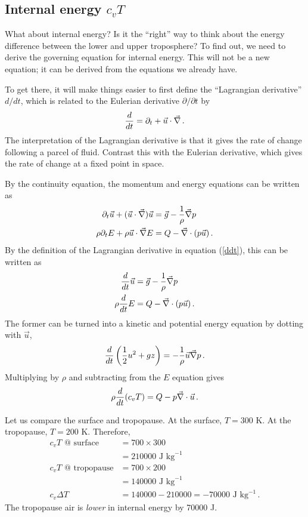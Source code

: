 \documentclass[12pt]{article}
\begin{document}
\subsection{Internal energy $c_v T$}


What about internal energy?  Is it the ``right'' way to think about the energy difference between the lower and upper troposphere?  To find out, we need to derive the governing equation for internal energy.  This will not be a new equation; it can be derived from the equations we already have.


To get there, it will make things easier to first define the ``Lagrangian derivative'' $d/dt$, which is related to the Eulerian derivative $\partial/\partial t$ by
\begin{equation}
{\frac{d}{dt}} = \partial_t + \vec{u} \cdot {\vec{\nabla}} \, . \label{ddt}
\end{equation}
The interpretation of the Lagrangian derivative is that it gives the rate of change following a parcel of fluid.  Contrast this with the Eulerian derivative, which gives the rate of change at a fixed point in space.


By the continuity equation, the momentum and energy equations can be written as
\begin{align}
\partial_t \vec{u} + (\vec{u} \cdot {\vec{\nabla}}) \vec{u} &= \vec{g} - \frac{1}{\rho} {\vec{\nabla}} p \\
\rho \partial_t E + \rho \vec{u} \cdot {\vec{\nabla}} E &= Q - {\vec{\nabla}} \cdot (p \vec{u}) \, .
\end{align}
By the definition of the Lagrangian derivative in equation (\ref{ddt}), this can be written as
\begin{align}
\frac{d}{dt} \vec{u} &= \vec{g} - \frac{1}{\rho} {\vec{\nabla}} p \\
\rho \frac{d}{dt} E &= Q - {\vec{\nabla}} \cdot (p \vec{u}) \, .
\end{align}
The former can be turned into a kinetic and potential energy equation by dotting with $\vec{u}$, 
\[
\frac{d}{dt} \left( \frac{1}{2} u^2 + gz \right) = - \frac{1}{\rho} \vec{u} {\vec{\nabla}} p \, .
\]
Multiplying by $\rho$ and subtracting from the $E$ equation gives
\begin{equation}
\rho \frac{d}{dt} (c_v T) = Q - p {\vec{\nabla}} \cdot \vec{u} \, . \label{internal}
\end{equation}


Let us compare the surface and tropopause.   At the surface, $T = 300$ K.  At the tropopause, $T = 200$ K.  Therefore,
\begin{align}
c_vT \text{ @ surface} &= 700 \times 300 \\
&= \num{210000} \text{ J kg}^{-1} \\
c_vT \text{ @ tropopause} &= 700 \times 200 \\
&= \num{140000} \text{ J kg}^{-1} \\
c_v \Delta T &= \num{140000} - \num{210000} = -\num{70000} \text{ J kg}^{-1} \, .
\end{align}
The tropopause air is {\it lower} in internal energy by \num{70000} J.
\end{document}
